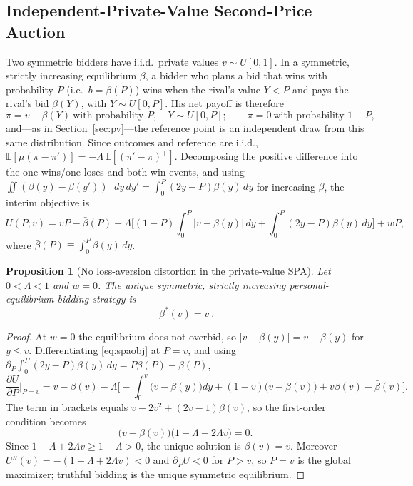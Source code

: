\documentclass[11pt,a4paper]{article}
\newtheorem{proposition}{Proposition}
\theoremstyle{remark}
\begin{document}
\subsection{Independent-Private-Value Second-Price Auction}
\label{sec:ipvspa}
Two symmetric bidders have i.i.d.\ private values $v\sim U[0,1]$. In a symmetric,
strictly increasing equilibrium $\beta$, a bidder who plans a bid that wins with
probability $P$ (i.e.\ $b=\beta(P)$) wins when the rival's value $Y<P$ and pays the
rival's bid $\beta(Y)$, with $Y\sim U[0,P]$. His net payoff is therefore
\begin{equation}
\pi=v-\beta(Y)\ \text{with probability }P,\quad Y\sim U[0,P];
\qquad \pi=0\ \text{with probability }1-P,
\end{equation}
and---as in Section~\ref{sec:pv}---the reference point is an independent draw from this
same distribution. Since outcomes and reference are i.i.d.,
$\mathbb{E}[\mu(\pi-\pi')]=-\Lambda\,\mathbb{E}[(\pi'-\pi)^+]$. Decomposing the positive
difference into the one-wins/one-loses and both-win events, and using
$\iint(\beta(y)-\beta(y'))^{+}dy\,dy'=\int_0^P(2y-P)\beta(y)\,dy$ for increasing
$\beta$, the interim objective is
\begin{equation}
U(P;v)=vP-\bar\beta(P)
-\Lambda\Big[(1-P)\!\int_0^P\!|v-\beta(y)|\,dy+\int_0^P(2y-P)\beta(y)\,dy\Big]+wP,
\label{eq:spaobj}
\end{equation}
where $\bar\beta(P)\equiv\int_0^P\beta(y)\,dy$.
\begin{proposition}[No loss-aversion distortion in the private-value SPA]
\label{prop:spa0}
Let $0<\Lambda<1$ and $w=0$. The unique symmetric, strictly increasing
personal-equilibrium bidding strategy is
\begin{equation}
\boxed{\ \beta^{*}(v)=v\ }.
\end{equation}
\end{proposition}
\begin{proof}
At $w=0$ the equilibrium does not overbid, so $|v-\beta(y)|=v-\beta(y)$ for $y\le v$.
Differentiating \eqref{eq:spaobj} at $P=v$, and using
$\partial_P\int_0^P(2y-P)\beta(y)\,dy=P\beta(P)-\bar\beta(P)$,
\begin{equation}
\frac{\partial U}{\partial P}\Big|_{P=v}
=v-\beta(v)-\Lambda\Big[-\!\int_0^v\!\big(v-\beta(y)\big)dy+(1-v)\big(v-\beta(v)\big)
+v\beta(v)-\bar\beta(v)\Big].
\end{equation}
The term in brackets equals $v-2v^{2}+(2v-1)\beta(v)$, so the first-order condition
becomes
\begin{equation}
\big(v-\beta(v)\big)\big(1-\Lambda+2\Lambda v\big)=0 .
\end{equation}
Since $1-\Lambda+2\Lambda v\ge 1-\Lambda>0$, the unique solution is $\beta(v)=v$.
Moreover $U''(v)=-(1-\Lambda+2\Lambda v)<0$ and $\partial_P U<0$ for $P>v$, so $P=v$
is the global maximizer; truthful bidding is the unique symmetric equilibrium.
\end{proof}
\end{document}
